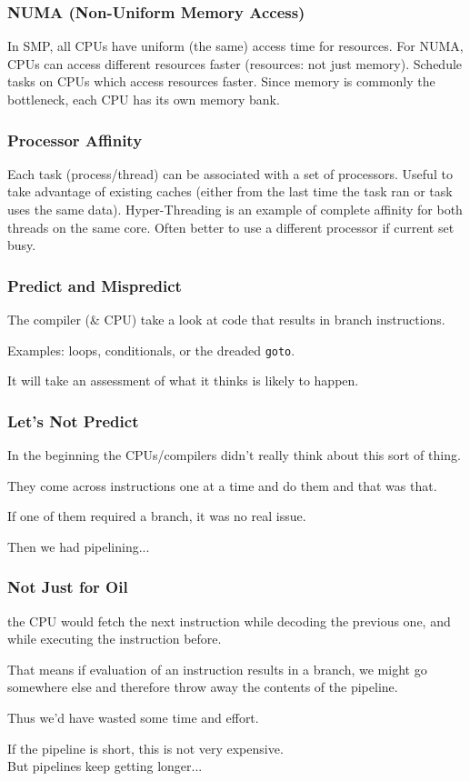 \begin{frame}
  \frametitle{NUMA (Non-Uniform Memory Access)}


    In SMP, all CPUs have uniform (the same) access time for resources.
    \vfill
    For NUMA, CPUs can access different resources faster (resources: not just
          memory).
    \vfill
    Schedule tasks on CPUs which access resources faster.
    \vfill
    Since memory is commonly the bottleneck, each CPU has its own memory
          bank.

\end{frame}

\begin{frame}
  \frametitle{Processor Affinity}


    Each task (process/thread) can be associated with a set of processors.
    \vfill
    Useful to take advantage of existing caches (either from the last time
          the task ran or task uses the same data).
    \vfill
    Hyper-Threading is an example of complete affinity for both threads on
          the same core.
    \vfill
    Often better to use a different processor if current set busy.

\end{frame}



\begin{frame}
\frametitle{Predict and Mispredict}
The compiler (\& CPU) take a look at code that results in branch instructions.

Examples: loops, conditionals, or the dreaded \texttt{goto}.

It will take an assessment of what it thinks is likely to happen. 

\end{frame}



\begin{frame}
\frametitle{Let's Not Predict}

In the beginning the CPUs/compilers didn't really think about this sort of thing.

They come across instructions one at a time and do them and that was that. 

If one of them required a branch, it was no real issue. 

Then we had pipelining...
\end{frame}



\begin{frame}
\frametitle{Not Just for Oil}

the CPU would fetch the next instruction while decoding the previous one, and while executing the instruction before. 

That means if evaluation of an instruction results in a branch, we might go somewhere else and therefore throw away the contents of the pipeline. 

Thus we'd have wasted some time and effort. 

If the pipeline is short, this is not very expensive.\\
\quad But pipelines keep getting longer... 

\end{frame}



